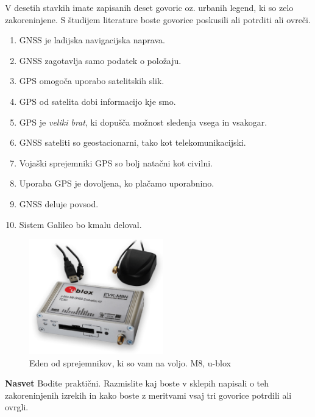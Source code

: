 V desetih stavkih imate zapisanih deset govoric oz. urbanih legend, ki so zelo zakoreninjene. S študijem literature boste govorice poskusili ali potrditi ali ovreči.

\begin{enumerate}
	\item GNSS je ladijska navigacijska naprava.
	\item GNSS zagotavlja samo podatek o položaju.
	\item GPS omogoča uporabo satelitskih slik.
	\item GPS od satelita dobi informacijo kje smo.
	\item GPS je \textit{veliki brat}, ki dopušča možnost sledenja vsega in vsakogar.
	\item GNSS sateliti so geostacionarni, tako kot telekomunikacijski.
	\item Vojaški sprejemniki GPS so bolj natačni kot civilni.
	\item Uporaba GPS je dovoljena, ko plačamo uporabnino.
	\item GNSS deluje povsod.
	\item Sistem Galileo bo kmalu deloval.
\end{enumerate}

\begin{figure}
	\centering
	\includegraphics[height=5cm]{Vaje/OmejGnssPrak/figs/EVK-M8_withcable_trans.png}
	\caption{Eden od sprejemnikov, ki so vam na voljo. M8, u-blox}
	\label{fig:OmejGnss_ubloxM8}
\end{figure}

\textbf{Nasvet} Bodite praktični. Razmislite kaj boste v sklepih napisali o teh zakoreninjenih izrekih in kako boste z meritvami vsaj tri govorice potrdili ali ovrgli.



